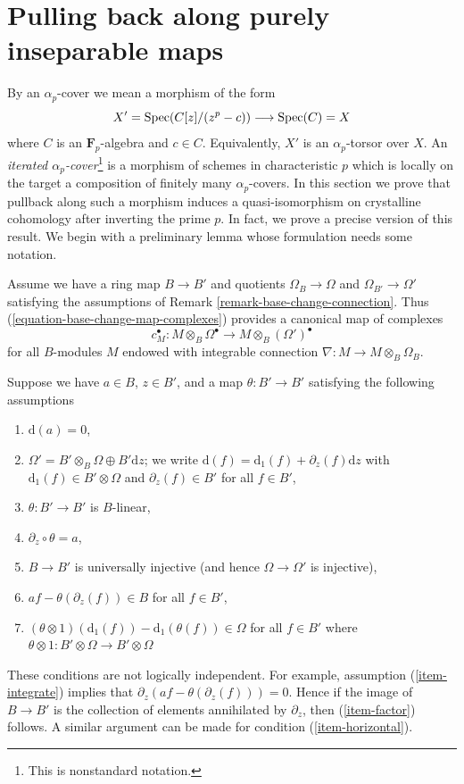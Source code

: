\section{Pulling back along purely inseparable maps}
\label{section-pull-back-along-pth-root}

\noindent
By an $\alpha_p$-cover we mean a morphism of the form
$$
X' = \mathop{\mathrm{Spec}}(C[z]/(z^p - c)) \longrightarrow \mathop{\mathrm{Spec}}(C) = X
$$
where $C$ is an $\mathbf{F}_p$-algebra and $c \in C$. Equivalently,
$X'$ is an $\alpha_p$-torsor over $X$. An {\it iterated
$\alpha_p$-cover}\footnote{This is nonstandard notation.}
is a morphism of schemes in characteristic
$p$ which is locally on the target a composition of finitely many
$\alpha_p$-covers. In this section we prove that pullback along
such a morphism induces a quasi-isomorphism on crystalline cohomology
after inverting the prime $p$. In fact, we prove a precise version
of this result. We begin with a preliminary lemma whose formulation
needs some notation.

\medskip\noindent
Assume we have a ring map $B \to B'$ and quotients $\Omega_B \to \Omega$ and
$\Omega_{B'} \to \Omega'$ satisfying the assumptions of
Remark \ref{remark-base-change-connection}.
Thus (\ref{equation-base-change-map-complexes}) provides a
canonical map of complexes
$$
c_M^\bullet :
M \otimes_B \Omega^\bullet
\longrightarrow
M \otimes_B (\Omega')^\bullet
$$
for all $B$-modules $M$ endowed with integrable connection
$\nabla : M \to M \otimes_B \Omega_B$.

\medskip\noindent
Suppose we have $a \in B$, $z \in B'$, and a map $\theta : B' \to B'$
satisfying the following assumptions
\begin{enumerate}
\item
\label{item-d-a-zero}
$\text{d}(a) = 0$,
\item
\label{item-direct-sum}
$\Omega' = B' \otimes_B \Omega \oplus B'\text{d}z$; we write
$\text{d}(f) = \text{d}_1(f) + \partial_z(f) \text{d}z$
with $\text{d}_1(f) \in B' \otimes \Omega$ and $\partial_z(f) \in B'$
for all $f \in B'$,
\item
\label{item-theta-linear}
$\theta : B' \to B'$ is $B$-linear,
\item
\label{item-integrate}
$\partial_z \circ \theta = a$,
\item
\label{item-injective}
$B \to B'$ is universally injective (and hence $\Omega \to \Omega'$
is injective),
\item
\label{item-factor}
$af - \theta(\partial_z(f)) \in B$ for all $f \in B'$,
\item
\label{item-horizontal}
$(\theta \otimes 1)(\text{d}_1(f)) - \text{d}_1(\theta(f)) \in \Omega$
for all $f \in B'$ where
$\theta \otimes 1 : B' \otimes \Omega \to B' \otimes \Omega$
\end{enumerate}
These conditions are not logically independent.
For example, assumption (\ref{item-integrate}) implies
that $\partial_z(af - \theta(\partial_z(f))) = 0$.
Hence if the image of $B \to B'$ is the collection of
elements annihilated by $\partial_z$, then (\ref{item-factor})
follows. A similar argument can be made for condition (\ref{item-horizontal}).

